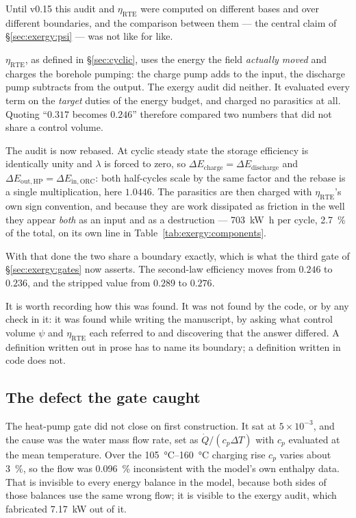 Until v0.15 this audit and $\eta_{\mathrm{RTE}}$ were computed on different
bases and over different boundaries, and the comparison between them --- the
central claim of \S\ref{sec:exergy:psi} --- was not like for like.

$\eta_{\mathrm{RTE}}$, as defined in \S\ref{sec:cyclic}, uses the energy the
field \emph{actually moved} and charges the borehole pumping: the charge pump
adds to the input, the discharge pump subtracts from the output. The exergy
audit did neither. It evaluated every term on the \emph{target} duties of the
energy budget, and charged no parasitics at all. Quoting
``$\num{0.317}$ becomes $\num{0.246}$'' therefore compared two numbers that
did not share a control volume.

The audit is now rebased. At cyclic steady state the storage efficiency is
identically unity and $\lambda$ is forced to zero, so
$\Delta E_{\mathrm{charge}} = \Delta E_{\mathrm{discharge}}$ and
$\Delta E_{\mathrm{out,HP}} = \Delta E_{\mathrm{in,ORC}}$: both half-cycles
scale by the same factor and the rebase is a single multiplication, here
$\num{1.0446}$. The parasitics are then charged with
$\eta_{\mathrm{RTE}}$'s own sign convention, and because they are work
dissipated as friction in the well they appear \emph{both} as an input and as
a destruction --- \SI{703}{\kilo\watt\hour} per cycle, \SI{2.7}{\percent} of
the total, on its own line in Table~\ref{tab:exergy:components}.

With that done the two share a boundary exactly, which is what the third gate
of \S\ref{sec:exergy:gates} now asserts. The second-law efficiency moves from
$\num{0.246}$ to $\num{0.236}$, and the stripped value from $\num{0.289}$ to
$\num{0.276}$.

It is worth recording how this was found. It was not found by the code, or by
any check in it: it was found while writing the manuscript, by asking what
control volume $\psi$ and $\eta_{\mathrm{RTE}}$ each referred to and
discovering that the answer differed. A definition written out in prose has to
name its boundary; a definition written in code does not.

\subsection{The defect the gate caught}
\label{sec:exergy:defect}

The heat-pump gate did not close on first construction. It sat at
$5\times10^{-3}$, and the cause was the water mass flow rate, set as
$\dot Q / (c_p \Delta T)$ with $c_p$ evaluated at the mean temperature. Over
the \SIrange{105}{160}{\celsius} charging rise $c_p$ varies about
\SI{3}{\percent}, so the flow was \SI{0.096}{\percent} inconsistent with the
model's own enthalpy data. That is invisible to every energy balance in the
model, because both sides of those balances use the same wrong flow; it is
visible to the exergy audit, which fabricated \SI{7.17}{\kilo\watt} out of it.

